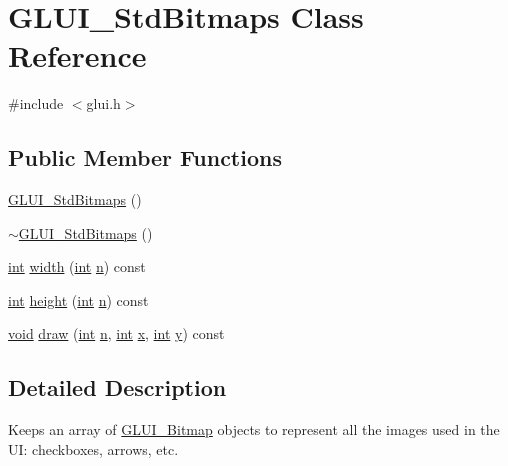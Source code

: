 \hypertarget{class_g_l_u_i___std_bitmaps}{\section{G\+L\+U\+I\+\_\+\+Std\+Bitmaps Class Reference}
\label{class_g_l_u_i___std_bitmaps}
}


{\ttfamily \#include $<$glui.\+h$>$}

\subsection*{Public Member Functions}
\begin{DoxyCompactItemize}
\item 
\hyperlink{class_g_l_u_i___std_bitmaps_a37cf47766c3dd9eedd84360f017d5a5e}{G\+L\+U\+I\+\_\+\+Std\+Bitmaps} ()
\item 
\hyperlink{class_g_l_u_i___std_bitmaps_a56439178a037e91a701450feb69f2474}{$\sim$\+G\+L\+U\+I\+\_\+\+Std\+Bitmaps} ()
\item 
\hyperlink{wglext_8h_a500a82aecba06f4550f6849b8099ca21}{int} \hyperlink{class_g_l_u_i___std_bitmaps_ad3a2b8300692f83de6329545f716597f}{width} (\hyperlink{wglext_8h_a500a82aecba06f4550f6849b8099ca21}{int} \hyperlink{glext_8h_ae2b4646468bc89d0ba646f5cf838e051}{n}) const 
\item 
\hyperlink{wglext_8h_a500a82aecba06f4550f6849b8099ca21}{int} \hyperlink{class_g_l_u_i___std_bitmaps_a300ea4a965d0b80777bcc7e0e7117dd8}{height} (\hyperlink{wglext_8h_a500a82aecba06f4550f6849b8099ca21}{int} \hyperlink{glext_8h_ae2b4646468bc89d0ba646f5cf838e051}{n}) const 
\item 
\hyperlink{wglext_8h_a9e6b7f1933461ef318bb000d6bd13b83}{void} \hyperlink{class_g_l_u_i___std_bitmaps_ae073d4320cc030a1d0a7032d54334838}{draw} (\hyperlink{wglext_8h_a500a82aecba06f4550f6849b8099ca21}{int} \hyperlink{glext_8h_ae2b4646468bc89d0ba646f5cf838e051}{n}, \hyperlink{wglext_8h_a500a82aecba06f4550f6849b8099ca21}{int} \hyperlink{glext_8h_ad77deca22f617d3f0e0eb786445689fc}{x}, \hyperlink{wglext_8h_a500a82aecba06f4550f6849b8099ca21}{int} \hyperlink{glext_8h_a9298c7ad619074f5285b32c6b72bfdea}{y}) const 
\end{DoxyCompactItemize}


\subsection{Detailed Description}
Keeps an array of \hyperlink{class_g_l_u_i___bitmap}{G\+L\+U\+I\+\_\+\+Bitmap} objects to represent all the images used in the U\+I\+: checkboxes, arrows, etc. 

